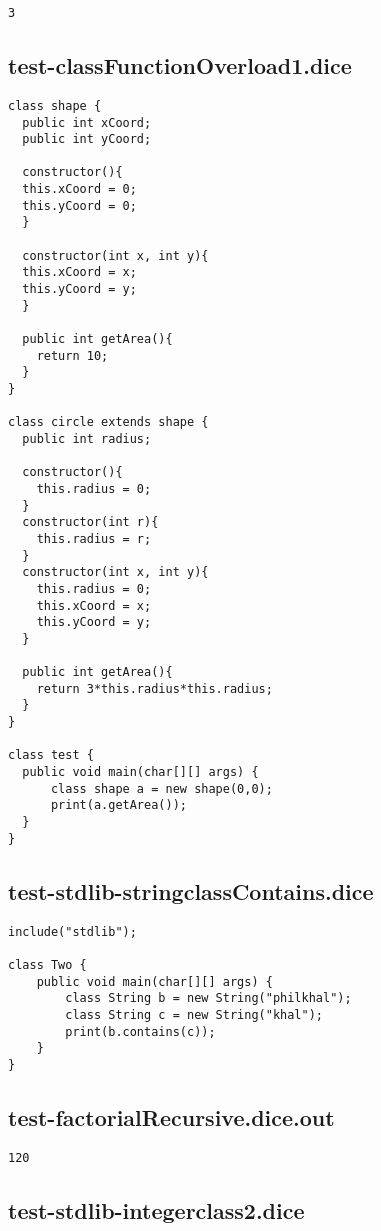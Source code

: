 \begin{verbatim}
3
\end{verbatim}\pagebreak\subsection{test-classFunctionOverload1.dice}
\begin{verbatim}
class shape {
  public int xCoord;
  public int yCoord;

  constructor(){
  this.xCoord = 0;
  this.yCoord = 0;
  }

  constructor(int x, int y){
  this.xCoord = x;
  this.yCoord = y;
  }

  public int getArea(){
    return 10;
  }
}

class circle extends shape {
  public int radius;

  constructor(){
  	this.radius = 0;
  }
  constructor(int r){
  	this.radius = r;
  }
  constructor(int x, int y){
  	this.radius = 0;
  	this.xCoord = x;
  	this.yCoord = y;
  }

  public int getArea(){
    return 3*this.radius*this.radius;
  }
}

class test {
  public void main(char[][] args) {
      class shape a = new shape(0,0); 
      print(a.getArea());
  }
}
\end{verbatim}\pagebreak\subsection{test-stdlib-stringclassContains.dice}
\begin{verbatim}
include("stdlib");

class Two {
	public void main(char[][] args) {
        class String b = new String("philkhal");
        class String c = new String("khal");
        print(b.contains(c));
	}
}

\end{verbatim}\pagebreak\subsection{test-factorialRecursive.dice.out}
\begin{verbatim}
120
\end{verbatim}\pagebreak\subsection{test-stdlib-integerclass2.dice}

